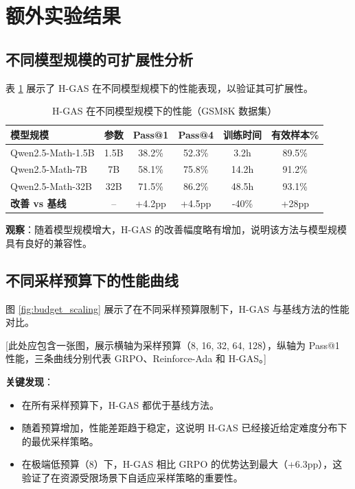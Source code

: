 \section{额外实验结果}
\label{sec:appendix_extra_experiments}

\subsection{不同模型规模的可扩展性分析}

表 \ref{tab:model_scaling} 展示了 H-GAS 在不同模型规模下的性能表现，以验证其可扩展性。

\begin{table}[htbp]
    \centering
    \caption{H-GAS 在不同模型规模下的性能（GSM8K 数据集）}\label{tab:model_scaling}
    \begin{tabular}{|l|c|c|c|c|c|}
    \hline
    \textbf{模型规模} & \textbf{参数} & \textbf{Pass@1} & \textbf{Pass@4} & \textbf{训练时间} & \textbf{有效样本\%} \\
    \hline
    Qwen2.5-Math-1.5B & 1.5B & 38.2\% & 52.3\% & 3.2h & 89.5\% \\
    Qwen2.5-Math-7B & 7B & 58.1\% & 75.8\% & 14.2h & 91.2\% \\
    Qwen2.5-Math-32B & 32B & 71.5\% & 86.2\% & 48.5h & 93.1\% \\
    \hline
    \textbf{改善 vs 基线} & -- & +4.2pp & +4.5pp & -40\% & +28pp \\
    \hline
    \end{tabular}
\end{table}

\textbf{观察}：随着模型规模增大，H-GAS 的改善幅度略有增加，说明该方法与模型规模具有良好的兼容性。

\subsection{不同采样预算下的性能曲线}

图 \ref{fig:budget_scaling} 展示了在不同采样预算限制下，H-GAS 与基线方法的性能对比。

[此处应包含一张图，展示横轴为采样预算（8, 16, 32, 64, 128），纵轴为 Pass@1 性能，三条曲线分别代表 GRPO、Reinforce-Ada 和 H-GAS。]

\textbf{关键发现}：
\begin{itemize}
    \item 在所有采样预算下，H-GAS 都优于基线方法。
    \item 随着预算增加，性能差距趋于稳定，这说明 H-GAS 已经接近给定难度分布下的最优采样策略。
    \item 在极端低预算（8）下，H-GAS 相比 GRPO 的优势达到最大（+6.3pp），这验证了在资源受限场景下自适应采样策略的重要性。
\end{itemize}

